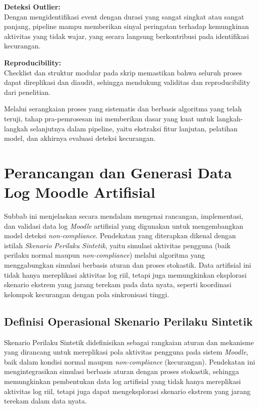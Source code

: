 \textbf{Deteksi Outlier:} \\
Dengan mengidentifikasi event dengan durasi yang sangat singkat atau sangat panjang, pipeline mampu memberikan sinyal peringatan terhadap kemungkinan aktivitas yang tidak wajar, yang secara langsung berkontribusi pada identifikasi kecurangan.

\textbf{Reproducibility:} \\
Checklist dan struktur modular pada skrip memastikan bahwa seluruh proses dapat direplikasi dan diaudit, sehingga mendukung validitas dan reproducibility dari penelitian.

Melalui serangkaian proses yang sistematis dan berbasis algoritma yang telah teruji, tahap pra-pemrosesan ini memberikan dasar yang kuat untuk langkah-langkah selanjutnya dalam pipeline, yaitu ekstraksi fitur lanjutan, pelatihan model, dan akhirnya evaluasi deteksi kecurangan.

\section{Perancangan dan Generasi Data Log Moodle Artifisial}
\label{sec:perancanganGenerasiDataArtifisial}
Subbab ini menjelaskan secara mendalam mengenai rancangan, implementasi, dan validasi data log \textit{Moodle} artifisial yang digunakan untuk mengembangkan model deteksi \textit{non-compliance}. Pendekatan yang diterapkan dikenal dengan istilah \textit{Skenario Perilaku Sintetik}, yaitu simulasi aktivitas pengguna (baik perilaku normal maupun \textit{non-compliance}) melalui algoritma yang menggabungkan simulasi berbasis aturan dan proses stokastik. Data artifisial ini tidak hanya mereplikasi aktivitas log riil, tetapi juga memungkinkan eksplorasi skenario ekstrem yang jarang terekam pada data nyata, seperti koordinasi kelompok kecurangan dengan pola sinkronisasi tinggi.

\subsection{Definisi Operasional Skenario Perilaku Sintetik}
\label{sec:definisiOperasionalSkenarioPerilakuSintetik}
Skenario Perilaku Sintetik didefinisikan sebagai rangkaian aturan dan mekanisme yang dirancang untuk mereplikasi pola aktivitas pengguna pada sistem \textit{Moodle}, baik dalam kondisi normal maupun \textit{non-compliance} (kecurangan). Pendekatan ini mengintegrasikan simulasi berbasis aturan dengan proses stokastik, sehingga memungkinkan pembentukan data log artifisial yang tidak hanya mereplikasi aktivitas log riil, tetapi juga dapat mengeksplorasi skenario ekstrem yang jarang terekam dalam data nyata.

